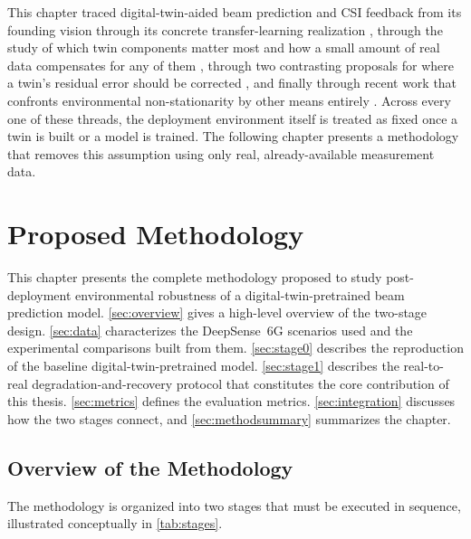 \documentclass{iutbscthesis}
\begin{document}
This chapter traced digital-twin-aided beam prediction and CSI feedback from its founding vision through its concrete transfer-learning realization \cite{alkhateeb2023realtime, jiang2023digitaltwinbeam, jiang2024digitaltwincsi}, through the study of which twin components matter most and how a small amount of real data compensates for any of them \cite{luo2025fidelity}, through two contrasting proposals for where a twin's residual error should be corrected \cite{luo2026calibration, jiang2025learnable}, and finally through recent work that confronts environmental non-stationarity by other means entirely \cite{cao2025memristor, khan2025dtxai, zhang2026radtwin}. Across every one of these threads, the deployment environment itself is treated as fixed once a twin is built or a model is trained. The following chapter presents a methodology that removes this assumption using only real, already-available measurement data.

\chapter{Proposed Methodology}
\label{chapter:proposed}

This chapter presents the complete methodology proposed to study post-deployment environmental robustness of a digital-twin-pretrained beam prediction model. \autoref{sec:overview} gives a high-level overview of the two-stage design. \autoref{sec:data} characterizes the DeepSense~6G scenarios used and the experimental comparisons built from them. \autoref{sec:stage0} describes the reproduction of the baseline digital-twin-pretrained model. \autoref{sec:stage1} describes the real-to-real degradation-and-recovery protocol that constitutes the core contribution of this thesis. \autoref{sec:metrics} defines the evaluation metrics. \autoref{sec:integration} discusses how the two stages connect, and \autoref{sec:methodsummary} summarizes the chapter.

\section{Overview of the Methodology}
\label{sec:overview}

The methodology is organized into two stages that must be executed in sequence, illustrated conceptually in \autoref{tab:stages}.
\end{document}
